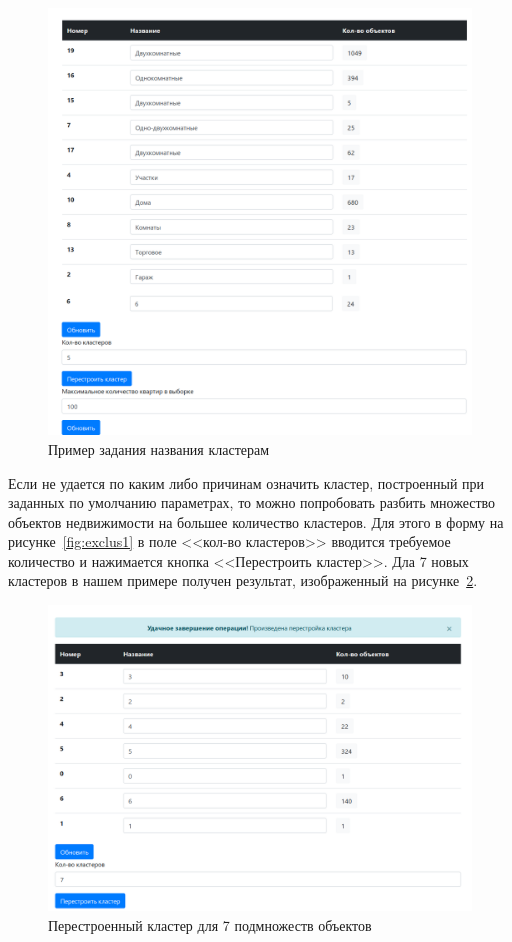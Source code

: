 \documentclass[a4paper,14pt,openany,final]{extreport} %
\begin{document}
{\begin{figure}[htbp]
  \centering
  \includegraphics[width=0.8\linewidth]{screen-cluster.png}
  \caption{Пример задания названия кластерам}
  \label{fig:cluscontent}
\end{figure}

Если не удается по каким либо причинам означить кластер, построенный при заданных по умолчанию параметрах, то можно попробовать разбить множество объектов недвижимости на большее количество кластеров. Для этого в форму на рисунке~\ref{fig:exclus1} в поле <<кол-во кластеров>> вводится требуемое количество и нажимается кнопка <<Перестроить кластер>>. Дла 7 новых кластеров в нашем примере получен результат, изображенный на рисунке~\ref{fig:renewcluster}.

\begin{figure}[htbp]
  \centering
  \includegraphics[width=0.8\linewidth]{screen-cluster-rebuild.png}
  \caption{Перестроенный кластер для 7 подмножеств объектов}
  \label{fig:renewcluster}
\end{figure}

}
\end{document}
